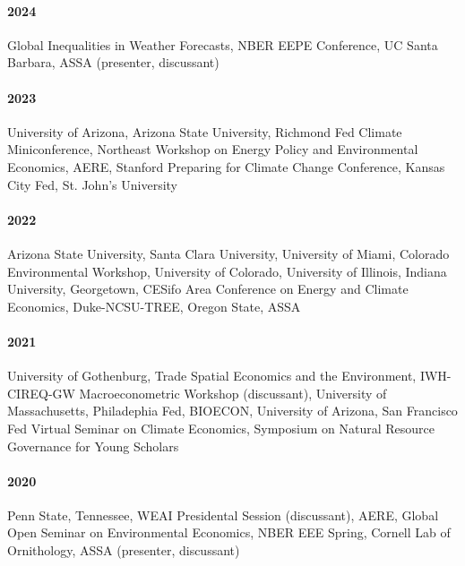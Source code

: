 \documentclass[11pt]{res} %
\begin{document}
\begin{resume}
\paragraph{2024} Global Inequalities in Weather Forecasts, NBER EEPE Conference, UC Santa Barbara, ASSA (presenter, discussant) \vspace{-.2in}
\paragraph{2023} University of Arizona, Arizona State University, Richmond Fed Climate Miniconference, Northeast Workshop on Energy Policy and Environmental Economics, AERE, Stanford Preparing for Climate Change Conference, Kansas City Fed, St. John's University \vspace{-.2in}
\paragraph{2022} Arizona State University, Santa Clara University, University of Miami, Colorado Environmental Workshop, University of Colorado, University of Illinois, Indiana University, Georgetown, CESifo Area Conference on Energy and Climate Economics, Duke-NCSU-TREE, Oregon State, ASSA \vspace{-.2in}
\paragraph{2021} University of Gothenburg, Trade Spatial Economics and the Environment, IWH-CIREQ-GW Macroeconometric Workshop (discussant), University of Massachusetts, Philadephia Fed, BIOECON, University of Arizona, San Francisco Fed Virtual Seminar on Climate Economics, Symposium on Natural Resource Governance for Young Scholars \vspace{-.2in}
\paragraph{2020} Penn State, Tennessee, WEAI Presidental Session (discussant), AERE, Global Open Seminar on Environmental Economics, NBER EEE Spring, Cornell Lab of Ornithology, ASSA (presenter, discussant) \vspace{-.2in}

\end{resume}
\end{document}
